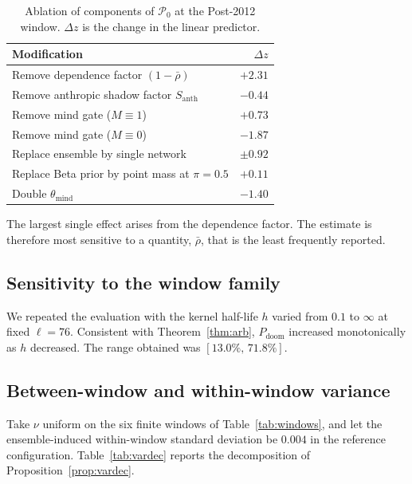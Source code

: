 \documentclass[11pt]{article}
\theoremstyle{remark}
\newcommand{\PD}{P_{\mathrm{doom}}}
\newcommand{\Santh}{S_{\mathrm{anth}}}
\newcommand{\rhobar}{\bar{\rho}}
\begin{document}
\begin{table}[h]
\centering
\caption{Ablation of components of $\mathcal{P}_0$ at the Post-2012 window. $\Delta z$ is the change in the linear predictor.}\label{tab:ablation}
\begin{tabular}{@{}lr@{}}
\toprule
Modification & $\Delta z$ \\
\midrule
Remove dependence factor $(1-\rhobar)$ & $+2.31$ \\
Remove anthropic shadow factor $\Santh$ & $-0.44$ \\
Remove mind gate ($M\equiv 1$) & $+0.73$ \\
Remove mind gate ($M\equiv 0$) & $-1.87$ \\
Replace ensemble by single network & $\pm 0.92$ \\
Replace Beta prior by point mass at $\pi=0.5$ & $+0.11$ \\
Double $\theta_{\mathrm{mind}}$ & $-1.40$ \\
\bottomrule
\end{tabular}
\end{table}

The largest single effect arises from the dependence factor. The estimate is therefore most sensitive to a quantity, $\rhobar$, that is the least frequently reported.

\subsection{Sensitivity to the window family}

We repeated the evaluation with the kernel half-life $h$ varied from $0.1$ to $\infty$ at fixed $\ell=76$. Consistent with Theorem~\ref{thm:arb}, $\PD$ increased monotonically as $h$ decreased. The range obtained was $[13.0\%,\,71.8\%]$.

\subsection{Between-window and within-window variance}

Take $\nu$ uniform on the six finite windows of Table~\ref{tab:windows}, and let the ensemble-induced within-window standard deviation be $0.004$ in the reference configuration. Table~\ref{tab:vardec} reports the decomposition of Proposition~\ref{prop:vardec}.
\end{document}

